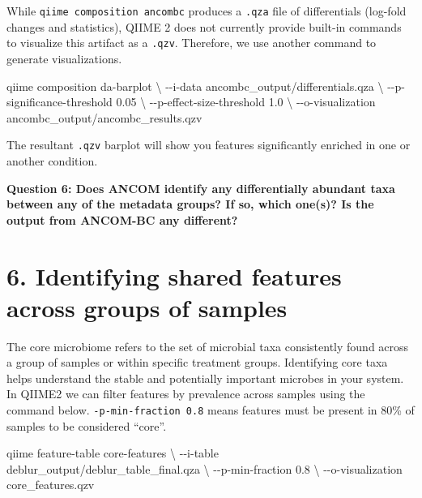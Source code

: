 \documentclass[
]{book}
\newenvironment{Shaded}{\begin{snugshade}}{\end{snugshade}}
\newcommand{\AttributeTok}[1]{\textcolor[rgb]{0.13,0.29,0.53}{#1}}
\newcommand{\DataTypeTok}[1]{\textcolor[rgb]{0.13,0.29,0.53}{#1}}
\newcommand{\ExtensionTok}[1]{#1}
\newcommand{\NormalTok}[1]{#1}
\begin{document}
While \texttt{qiime\ composition\ ancombc} produces a \texttt{.qza} file of differentials (log-fold changes and statistics), QIIME 2 does not currently provide built-in commands to visualize this artifact as a \texttt{.qzv}. Therefore, we use another command to generate visualizations.

\begin{Shaded}
\begin{Highlighting}[]
\ExtensionTok{qiime}\NormalTok{ composition da{-}barplot }\DataTypeTok{\textbackslash{}}
  \AttributeTok{{-}{-}i{-}data}\NormalTok{ ancombc\_output/differentials.qza }\DataTypeTok{\textbackslash{}}
  \AttributeTok{{-}{-}p{-}significance{-}threshold}\NormalTok{ 0.05 }\DataTypeTok{\textbackslash{}}
  \AttributeTok{{-}{-}p{-}effect{-}size{-}threshold}\NormalTok{ 1.0 }\DataTypeTok{\textbackslash{}}
  \AttributeTok{{-}{-}o{-}visualization}\NormalTok{ ancombc\_output/ancombc\_results.qzv}
\end{Highlighting}
\end{Shaded}

The resultant \texttt{.qzv} barplot will show you features significantly enriched in one or another condition.

\textbf{Question 6: Does ANCOM identify any differentially abundant taxa between any of the metadata groups? If so, which one(s)? Is the output from ANCOM-BC any different?}

\section{6. Identifying shared features across groups of samples}\label{core-microbiome}

The core microbiome refers to the set of microbial taxa consistently found across a group of samples or within specific treatment groups. Identifying core taxa helps understand the stable and potentially important microbes in your system. In QIIME2 we can filter features by prevalence across samples using the command below. \texttt{-p-min-fraction\ 0.8} means features must be present in 80\% of samples to be considered ``core''.

\begin{Shaded}
\begin{Highlighting}[]
\ExtensionTok{qiime}\NormalTok{ feature{-}table core{-}features }\DataTypeTok{\textbackslash{}}
  \AttributeTok{{-}{-}i{-}table}\NormalTok{ deblur\_output/deblur\_table\_final.qza }\DataTypeTok{\textbackslash{}}
  \AttributeTok{{-}{-}p{-}min{-}fraction}\NormalTok{ 0.8 }\DataTypeTok{\textbackslash{}}
  \AttributeTok{{-}{-}o{-}visualization}\NormalTok{ core\_features.qzv}
\end{Highlighting}
\end{Shaded}
\end{document}
